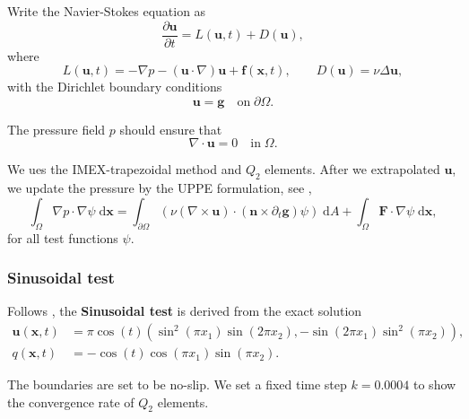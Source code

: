 \documentclass[lang=en,11pt,a4paper,bibend=bibtex]{elegantpaper}
\begin{document}
Write the Navier-Stokes equation as
\begin{equation}
    \frac{\partial \mathbf{u}}{\partial t}=L(\mathbf{u},t)+D(\mathbf{u}),
\end{equation}
where
\begin{equation*}
    L(\mathbf{u},t)=-\nabla p-(\mathbf{u}\cdot\nabla)\mathbf{u}
    +\mathbf{f}(\mathbf{x},t),
    \qquad D(\mathbf{u})=\nu\Delta\mathbf{u},
\end{equation*}
with the Dirichlet boundary conditions
\begin{equation}
    \mathbf{u}=\mathbf{g}\quad \text{on}\;\partial\Omega.
\end{equation}

The pressure field $p$ should ensure that
\begin{equation}
    \nabla\cdot \mathbf{u}=0\quad \text{in}\;\Omega.
\end{equation}

We ues the IMEX-trapezoidal method and $Q_2$ elements. 
After we extrapolated $\mathbf{u}$, we update the pressure by 
the UPPE formulation, see \cite{Liu2010},
\begin{equation}
    \int_\Omega \nabla p \cdot \nabla \psi \;\text{d}\mathbf{x} = 
    \int_{\partial\Omega} (\nu(\nabla \times \mathbf{u}) \cdot 
    (\mathbf{n} \times \partial_t \mathbf{g}) \psi ) \;\text{d}A
    + \int_\Omega \mathbf{F} \cdot \nabla \psi \;\text{d}\mathbf{x},
\end{equation}
for all test functions $\psi$.

\subsubsection{Sinusoidal test}

Follows \cite{Shirokoff2011}, the \textbf{Sinusoidal test} is derived 
from the exact solution
\begin{align}
    \mathbf{u}(\mathbf{x},t) &= \pi \cos(t) \left(
        \sin^2(\pi x_1)\sin(2\pi x_2),
        -\sin(2\pi x_1)\sin^2(\pi x_2)
    \right), \\
    q(\mathbf{x},t) &= -\cos(t) \cos(\pi x_1) \sin(\pi x_2).
\end{align}

The boundaries are set to be no-slip.
We set a fixed time step $k=0.0004$ to show the convergence rate
of $Q_2$ elements.
\end{document}
